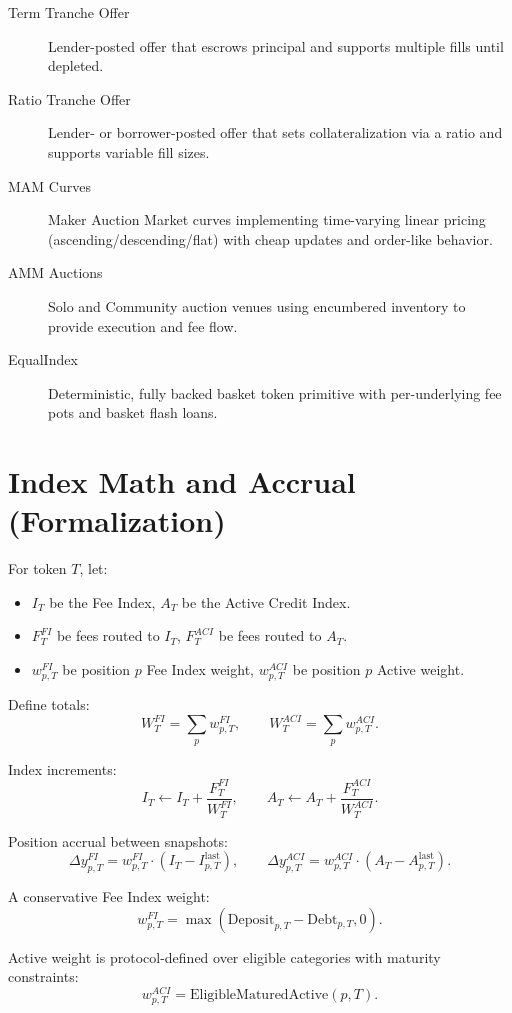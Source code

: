 \documentclass[version=preprint]{iacrcc}
\begin{document}
\begin{description}
  \item[Term Tranche Offer] Lender-posted offer that escrows principal and supports multiple fills until depleted.
  \item[Ratio Tranche Offer] Lender- or borrower-posted offer that sets collateralization via a ratio and supports variable fill sizes.
  \item[MAM Curves] Maker Auction Market curves implementing time-varying linear pricing (ascending/descending/flat) with cheap updates and order-like behavior.
  \item[AMM Auctions] Solo and Community auction venues using encumbered inventory to provide execution and fee flow.
  \item[EqualIndex] Deterministic, fully backed basket token primitive with per-underlying fee pots and basket flash loans.
\end{description}

\section{Index Math and Accrual (Formalization)}

For token $T$, let:
\begin{itemize}
  \item $I_T$ be the Fee Index, $A_T$ be the Active Credit Index.
  \item $F^{FI}_T$ be fees routed to $I_T$, $F^{ACI}_T$ be fees routed to $A_T$.
  \item $w^{FI}_{p,T}$ be position $p$ Fee Index weight, $w^{ACI}_{p,T}$ be position $p$ Active weight.
\end{itemize}

Define totals:
\[
W^{FI}_T = \sum_p w^{FI}_{p,T},
\qquad
W^{ACI}_T = \sum_p w^{ACI}_{p,T}.
\]

Index increments:
\[
I_T \leftarrow I_T + \frac{F^{FI}_T}{W^{FI}_T},
\qquad
A_T \leftarrow A_T + \frac{F^{ACI}_T}{W^{ACI}_T}.
\]

Position accrual between snapshots:
\[
\Delta y^{FI}_{p,T} = w^{FI}_{p,T}\cdot(I_T - I^{\text{last}}_{p,T}),
\qquad
\Delta y^{ACI}_{p,T} = w^{ACI}_{p,T}\cdot(A_T - A^{\text{last}}_{p,T}).
\]

A conservative Fee Index weight:
\[
w^{FI}_{p,T} = \max(\text{Deposit}_{p,T} - \text{Debt}_{p,T}, 0).
\]

Active weight is protocol-defined over eligible categories with maturity constraints:
\[
w^{ACI}_{p,T} = \text{EligibleMaturedActive}(p,T).
\]
\end{document}
